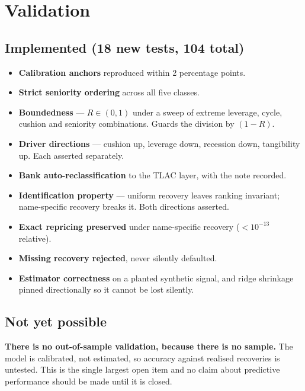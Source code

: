 \documentclass[11pt,a4paper]{article}
\newcommand{\keypoint}[1]{\par\vspace{0.4em}\noindent
  \colorbox{codebg}{\parbox{\dimexpr\linewidth-2\fboxsep}{\small #1}}\par\vspace{0.5em}}
\begin{document}
\section{Validation}

\subsection{Implemented (18 new tests, 104 total)}

\begin{itemize}[leftmargin=1.4em,itemsep=0.15em]
\item \textbf{Calibration anchors} reproduced within 2 percentage points.
\item \textbf{Strict seniority ordering} across all five classes.
\item \textbf{Boundedness} --- $R \in (0,1)$ under a sweep of extreme leverage, cycle,
cushion and seniority combinations. Guards the division by $(1-R)$.
\item \textbf{Driver directions} --- cushion up, leverage down, recession down,
tangibility up. Each asserted separately.
\item \textbf{Bank auto-reclassification} to the TLAC layer, with the note recorded.
\item \textbf{Identification property} --- uniform recovery leaves ranking invariant;
name-specific recovery breaks it. Both directions asserted.
\item \textbf{Exact repricing preserved} under name-specific recovery
($< 10^{-13}$ relative).
\item \textbf{Missing recovery rejected}, never silently defaulted.
\item \textbf{Estimator correctness} on a planted synthetic signal, and ridge shrinkage
pinned directionally so it cannot be lost silently.
\end{itemize}

\subsection{Not yet possible}

\keypoint{\textbf{There is no out-of-sample validation, because there is no sample.}
The model is calibrated, not estimated, so accuracy against realised recoveries is
untested. This is the single largest open item and no claim about predictive
performance should be made until it is closed.}
\end{document}
